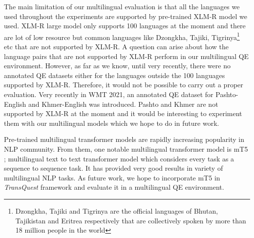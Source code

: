 The main limitation of our multilingual evaluation is that all the languages we used throughout the experiments are supported by pre-trained XLM-R model we used. XLM-R large model only supports 100 languages at the moment and there are lot of low resource but common languages like Dzongkha, Tajiki, Tigrinya\footnote{Dzongkha, Tajiki and Tigrinya are the official languages of Bhutan, Tajikistan and Eritrea respectively that are collectively spoken by more than 18 million people in the world} etc that are not supported by XLM-R. A question can arise about how the language pairs that are not supported by XLM-R perform in our multilingual QE environment. However, as far as we know, until very recently, there were no annotated QE datasets either for the languages outside the 100 languages supported by XLM-R. Therefore, it would not be possible to carry out a proper evaluation. Very recently in WMT 2021, an annotated QE dataset for Pashto-English and Khmer-English was introduced. Pashto and Khmer are not supported by XLM-R at the moment and it would be interesting to experiment them with our multilingual models which we hope to do in future work.

Pre-trained multilingual transformer models are rapidly increasing popularity in NLP community. From them, one notable multilingual transformer model is mT5 \cite{xue-etal-2021-mt5}; multilingual text to text transformer model which considers every task as a sequence to sequence task. It has provided very good results in variety of multilingual NLP tasks. As future work, we hope to incorporate mT5 in \textit{TransQuest} framework and evaluate it in a multilingual QE environment.


